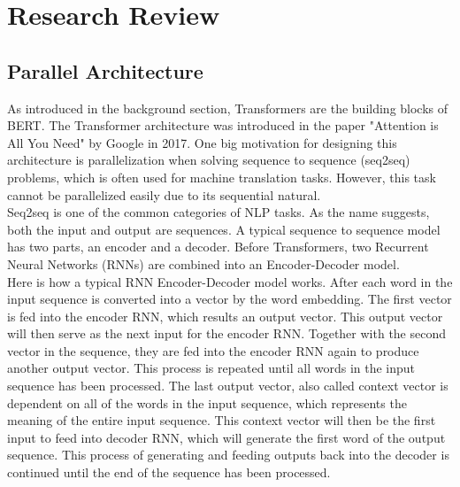 \documentclass[conference]{IEEEtran}
\begin{document}
\section{Research Review}
	\subsection{Parallel Architecture}
	As introduced in the background section, Transformers are the building blocks of BERT. The Transformer architecture was introduced in the paper "Attention is All You Need" \cite{attention} by Google in 2017. One big motivation for designing this architecture is parallelization when solving sequence to sequence (seq2seq) problems, which is often used for machine translation tasks. However, this task cannot be parallelized easily due to its sequential natural.\\
	
	Seq2seq is one of the common categories of NLP tasks. As the name suggests, both the input and output are sequences. A typical sequence to sequence model has two parts, an encoder and a decoder. Before Transformers, two Recurrent Neural Networks (RNNs) are combined into an Encoder-Decoder model.\cite{RNN}\\
	
	Here is how a typical RNN Encoder-Decoder model works. After each word in the input sequence is converted into a vector by the word embedding. The first vector is fed into the encoder RNN, which results  an output vector. This output vector will then serve as the next input for the encoder RNN. Together with the second vector in the sequence, they are fed into the encoder RNN again to produce another output vector. This process is repeated until all words in the input sequence has been processed. The last output vector, also called context vector is dependent on all of the words in the input sequence, which represents the meaning of the entire input sequence. This context vector will then be the first input to feed into decoder RNN, which will generate the first word of the output sequence. This process of generating and feeding outputs back into the decoder is continued until the end of the sequence has been processed.\\
	
\end{document}
